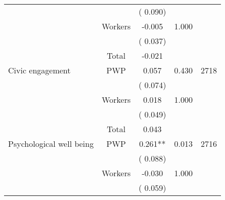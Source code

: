 \begin{tabular}{l*{4}{c}}
                               &                               &       (       0.090)                     & &                                                                             \\ 
                               &       Workers         &             -0.005               &        1.000   &                                               \\ 
                               &                               &       (       0.037)                     & &                                                                             \\ 
\cmidrule{2-3}
                               &       Total           &             -0.021                 &    &                                               \\ 
\cmidrule{2-3}
 Civic engagement                 &       PWP     &              0.057               &        0.430   & 2718                              \\ 
                               &                               &       (       0.074)                     & &                                                                             \\ 
                               &       Workers         &              0.018               &        1.000   &                                               \\ 
                               &                               &       (       0.049)                     & &                                                                             \\ 
\cmidrule{2-3}
                               &       Total           &              0.043                 &    &                                               \\ 
\cmidrule{2-3}
 Psychological well being                &       PWP     &              0.261**               &       0.013    & 2716                              \\ 
                               &                               &       (       0.088)                     & &                                                                             \\ 
                               &       Workers         &             -0.030               &        1.000   &                                               \\ 
                               &                               &       (       0.059)                     & &                                                                             \\ 

\end{tabular}
